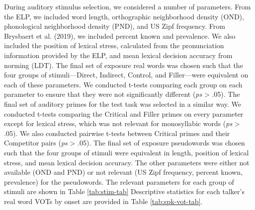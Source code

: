 \documentclass[
  12pt,
  twoside]{article}
\begin{document}
During auditory stimulus selection, we considered a number of parameters.
From the ELP, we included word length, orthographic neighborhood density (OND), phonological neighborhood density (PND), and US Zipf frequency.
From Brysbaert et al. (2019), we included percent known and prevalence.
We also included the position of lexical stress, calculated from the pronunciation information provided by the ELP, and mean lexical decision accuracy from norming (LDT).
The final set of exposure real words was chosen such that the four groups of stimuli---Direct, Indirect, Control, and Filler---were equivalent on each of these parameters.
We conducted t-tests comparing each group on each parameter to ensure that they were not significantly different (\emph{ps} \textgreater{} .05).
The final set of auditory primes for the test task was selected in a similar way.
We conducted t-tests comparing the Critical and Filler primes on every parameter except for lexical stress, which was not relevant for monosyllabic words (\emph{ps} \textgreater{} .05).
We also conducted pairwise t-tests between Critical primes and their Competitor pairs (\emph{ps} \textgreater{} .05).
The final set of exposure pseudowords was chosen such that the four groups of stimuli were equivalent in length, position of lexical stress, and mean lexical decision accuracy.
The other parameters were either not available (OND and PND) or not relevant (US Zipf frequency, percent known, prevalence) for the pseudowords.
The relevant parameters for each group of stimuli are shown in Table \ref{tab:stim-tab}
Descriptive statistics for each talker's real word VOTs by onset are provided in Table \ref{tab:spk-vot-tab}.
\end{document}
